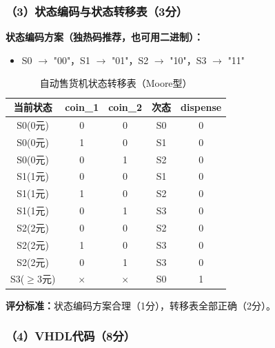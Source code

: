\subsubsection*{（3）状态编码与状态转移表（3分）}

\textbf{状态编码方案（独热码推荐，也可用二进制）：}
\begin{itemize}
  \item S0 $\to$ "00"，S1 $\to$ "01"，S2 $\to$ "10"，S3 $\to$ "11"
\end{itemize}

\begin{table}[h]
\centering
\caption{自动售货机状态转移表（Moore型）}
\begin{tabular}{|c|c|c|c|c|}
\hline
\textbf{当前状态} & \textbf{coin\_1} & \textbf{coin\_2} & \textbf{次态} & \textbf{dispense} \\
\hline
S0(0元) & 0 & 0 & S0 & 0 \\
S0(0元) & 1 & 0 & S1 & 0 \\
S0(0元) & 0 & 1 & S2 & 0 \\
\hline
S1(1元) & 0 & 0 & S1 & 0 \\
S1(1元) & 1 & 0 & S2 & 0 \\
S1(1元) & 0 & 1 & S3 & 0 \\
\hline
S2(2元) & 0 & 0 & S2 & 0 \\
S2(2元) & 1 & 0 & S3 & 0 \\
S2(2元) & 0 & 1 & S3 & 0 \\
\hline
S3($\ge$3元) & $\times$ & $\times$ & S0 & 1 \\
\hline
\end{tabular}
\end{table}
\textbf{评分标准：}状态编码方案合理（1分），转移表全部正确（2分）。

\subsubsection*{（4）VHDL代码（8分）}

